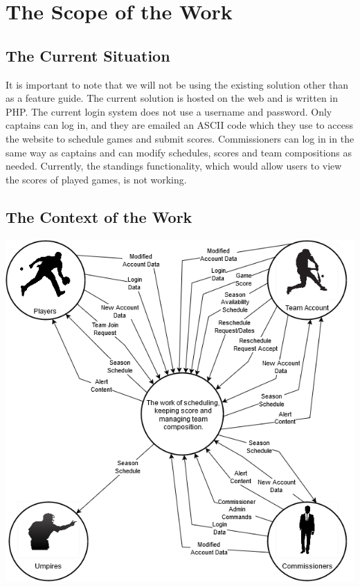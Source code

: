 \documentclass[12pt]{article}
\begin{document}
\section{The Scope of the Work}
\subsection{The Current Situation}
It is important to note that we will not be using the existing solution other
than as a feature guide. The current solution is hosted on the web and is
written in PHP. The current login system does not use a username and password.
Only captains can log in, and they are emailed an ASCII code which they use to
access the website to schedule games and submit scores. Commissioners can log in
in the same way as captains and can modify schedules, scores and team
compositions as needed. Currently, the standings functionality, which would
allow users to view the scores of played games, is not working.

\subsection{The Context of the Work}
\includegraphics[scale=0.6]{6_2_context_diagram.png}
\end{document}
